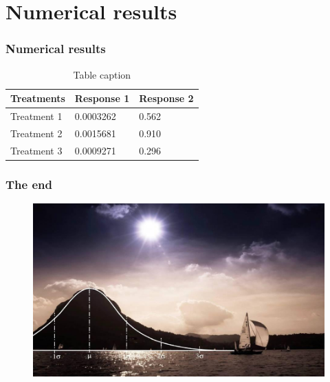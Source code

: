 \documentclass{beamer}
\begin{document}
\section{Numerical results}

\begin{frame}
\frametitle{Numerical results}
\begin{table}
\begin{tabular}{l l l}
\toprule
\textbf{Treatments} & \textbf{Response 1} & \textbf{Response 2}\\
\midrule
Treatment 1 & 0.0003262 & 0.562 \\
Treatment 2 & 0.0015681 & 0.910 \\
Treatment 3 & 0.0009271 & 0.296 \\
\bottomrule
\end{tabular}
\caption{Table caption}
\end{table}
\end{frame}


\begin{frame}
\frametitle{The end}
\begin{figure}
	\includegraphics[scale=0.35]{end}
\end{figure}
\end{frame}

\end{document}
